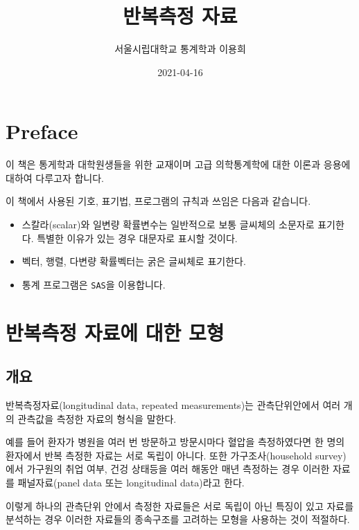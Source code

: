 \documentclass[
]{book}
\title{반복측정 자료}
\author{서울시립대학교 통계학과 이용희}
\date{2021-04-16}
\makeatletter
\providecommand{\tightlist}{%
  \setlength{\itemsep}{0pt}\setlength{\parskip}{0pt}}
\newenvironment{kframe}{%
\medskip{}
\setlength{\fboxsep}{.8em}
 \def\at@end@of@kframe{}%
 \ifinner\ifhmode%
  \def\at@end@of@kframe{\end{minipage}}%
  \begin{minipage}{\columnwidth}%
 \fi\fi%
 \def\FrameCommand##1{\hskip\@totalleftmargin \hskip-\fboxsep
 \colorbox{shadecolor}{##1}\hskip-\fboxsep
     \hskip-\linewidth \hskip-\@totalleftmargin \hskip\columnwidth}%
 \MakeFramed {\advance\hsize-\width
   \@totalleftmargin\z@ \linewidth\hsize
   \@setminipage}}%
 {\par\unskip\endMakeFramed%
 \at@end@of@kframe}
\newenvironment{rmdblock}[1]
  {
  \begin{itemize}
  \renewcommand{\labelitemi}{
    \raisebox{-.7\height}[0pt][0pt]{
      {\setkeys{Gin}{width=3em,keepaspectratio}\texttt{[image: images/\#1]}}
    }
  }
  \setlength{\fboxsep}{1em}
  \begin{kframe}
  \item
  }
  {
  \end{kframe}
  \end{itemize}
  }
\newenvironment{rmdimportant}
  {\begin{rmdblock}{important}}
  {\end{rmdblock}}
\theoremstyle{definition}
\theoremstyle{definition}
\theoremstyle{definition}
\theoremstyle{remark}
\makeatother
\begin{document}
\maketitle

{
\setcounter{tocdepth}{1}
\tableofcontents
}
\hypertarget{preface}{%
\chapter*{Preface}\label{preface}}


이 책은 통게학과 대학원생들을 위한 교재이며 고급 의학통계학에 대한 이론과 응용에 대하여 다루고자 합니다.

\begin{rmdimportant}
이 책에서 사용된 기호, 표기법, 프로그램의 규칙과 쓰임은 다음과 같습니다.

\begin{itemize}
\tightlist
\item
  스칼라(scalar)와 일변량 확률변수는 일반적으로 보통 글씨체의 소문자로 표기한다. 특별한 이유가 있는 경우 대문자로 표시할 것이다.
\item
  벡터, 행렬, 다변량 확률벡터는 굵은 글씨체로 표기한다.
\item
  통계 프로그램은 \texttt{SAS}을 이용합니다.
\end{itemize}
\end{rmdimportant}

\mainmatter

\hypertarget{glm}{%
\chapter{반복측정 자료에 대한 모형}\label{glm}}

\hypertarget{uxac1cuxc694}{%
\section{개요}\label{uxac1cuxc694}}

반복측정자료(longitudinal data, repeated measurements)는 관측단위안에서 여러 개의 관측값을 측정한 자료의 형식을 말한다.

예를 들어 환자가 병원을 여러 번 방문하고 방문시마다 혈압을 측정하였다면 한 명의 환자에서 반복 측정한 자료는 서로 독립이 아니다. 또한 가구조사(household survey)에서 가구원의 취업 여부, 건겅 상태등을 여러 해동안 매년 측정하는 경우 이러한 자료를 패널자료(panel data 또는 longitudinal data)라고 한다.

이렇게 하나의 관측단위 안에서 측정한 자료들은 서로 독립이 아닌 특징이 있고 자료를 분석하는 경우 이러한 자료들의 종속구조를 고려하는 모형을 사용하는 것이 적절하다.
\end{document}
